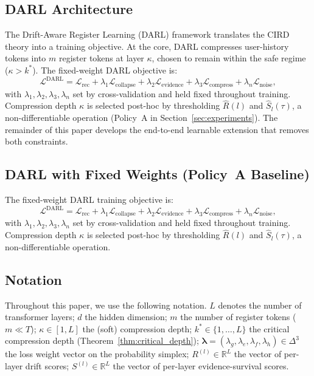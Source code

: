 \documentclass[lettersize,journal]{IEEEtran}
\newcommand{\R}{\mathbb{R}}
\newcommand{\calL}{\mathcal{L}}
\newcommand{\bS}{\hat{S}}
\newcommand{\bR}{\hat{R}}
\newcommand{\lambdavec}{\boldsymbol{\lambda}}
\begin{document}
\subsection{DARL Architecture}

The Drift-Aware Register Learning (DARL) framework
translates the CIRD theory into a training objective.
At the core, DARL compresses user-history tokens into $m$ register
tokens at layer $\kappa$, chosen to remain within the safe regime
($\kappa > k^*$).
The fixed-weight DARL objective is:
\begin{equation}
  \calL^{\text{DARL}} = \calL_{\text{rec}}
  + \lambda_1 \calL_{\text{collapse}}
  + \lambda_2 \calL_{\text{evidence}}
  + \lambda_3 \calL_{\text{compress}}
  + \lambda_n \calL_{\text{noise}},
  \label{eq:darl_objective}
\end{equation}
with $\lambda_1, \lambda_2, \lambda_3, \lambda_n$ set by
cross-validation and held fixed throughout training.
Compression depth $\kappa$ is selected post-hoc by thresholding
$\bR(l)$ and $\bS_l(\tau)$, a non-differentiable operation
(Policy~A in Section~\ref{sec:experiments}).
The remainder of this paper develops the end-to-end learnable
extension that removes both constraints.

\subsection{DARL with Fixed Weights (Policy~A Baseline)}

The fixed-weight DARL training objective is:
\begin{equation}
  \calL^{\text{DARL}} = \calL_{\text{rec}}
  + \lambda_1 \calL_{\text{collapse}}
  + \lambda_2 \calL_{\text{evidence}}
  + \lambda_3 \calL_{\text{compress}}
  + \lambda_n \calL_{\text{noise}},
  \label{eq:darl_fixed}
\end{equation}
with $\lambda_1, \lambda_2, \lambda_3, \lambda_n$ set by
cross-validation and held fixed throughout training.
Compression depth $\kappa$ is selected post-hoc by thresholding
$\bR(l)$ and $\bS_l(\tau)$, a non-differentiable operation.

\subsection{Notation}

Throughout this paper, we use the following notation.
$L$ denotes the number of transformer layers;
$d$ the hidden dimension;
$m$ the number of register tokens ($m \ll T$);
$\kappa \in [1, L]$ the (soft) compression depth;
$k^* \in \{1, \ldots, L\}$ the critical compression depth
(Theorem~\ref{thm:critical_depth});
$\lambdavec = (\lambda_g, \lambda_e, \lambda_f, \lambda_h) \in \Delta^3$
the loss weight vector on the probability simplex;
$R^{(l)} \in \R^L$ the vector of per-layer drift scores;
$S^{(l)} \in \R^L$ the vector of per-layer evidence-survival scores.
\end{document}
